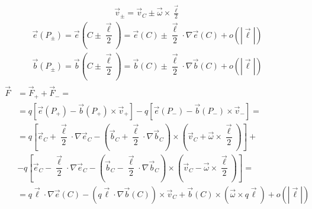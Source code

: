 \documentclass[letterpaper,10pt,english]{jupyterBook}
\begin{document}
\sphinxAtStartPar
{}
\begin{equation*}
\begin{split}\vec{v}_{\pm} = \vec{v}_C \pm \vec{\omega} \times \frac{\vec{\ell}}{2}\end{split}
\end{equation*}\begin{equation*}
\begin{split}\vec{e}(P_{\pm}) = \vec{e}\left( C \pm \dfrac{\vec{\ell}}{2} \right) = \vec{e}(C) \pm \dfrac{\vec{\ell}}{2} \cdot \nabla \vec{e}(C) + o(|\vec{\ell}|)\end{split}
\end{equation*}\begin{equation*}
\begin{split}\vec{b}(P_{\pm}) = \vec{b}\left( C \pm \dfrac{\vec{\ell}}{2} \right) = \vec{b}(C) \pm \dfrac{\vec{\ell}}{2} \cdot \nabla \vec{b}(C) + o(|\vec{\ell}|)\end{split}
\end{equation*}
\sphinxAtStartPar
{}
\begin{equation*}
\begin{split}\begin{aligned}
  \vec{F} & = \vec{F}_+ + \vec{F}_- = \\
   & = q \left[ \vec{e}(P_+) - \vec{b}(P_+) \times \vec{v}_{+} \right] - q \left[ \vec{e}(P_-) - \vec{b}(P_-) \times \vec{v}_{-} \right] = \\
   & = q \left[ \vec{e}_C + \dfrac{\vec{\ell}}{2} \cdot \nabla \vec{e}_C - \left( \vec{b}_C + \dfrac{\vec{\ell}}{2} \cdot \nabla \vec{b}_C \right) \times \left( \vec{v}_C + \vec{\omega} \times \dfrac{\vec{\ell}}{2} \right) \right] + \\ 
   & - q \left[ \vec{e}_C - \dfrac{\vec{\ell}}{2} \cdot \nabla \vec{e}_C - \left( \vec{b}_C - \dfrac{\vec{\ell}}{2} \cdot \nabla \vec{b}_C \right) \times \left( \vec{v}_C - \vec{\omega} \times \dfrac{\vec{\ell}}{2} \right) \right] = \\
   & = q \vec{\ell} \cdot \nabla \vec{e}(C) - \left( q \vec{\ell} \cdot \nabla \vec{b}(C) \right) \times \vec{v}_C + \vec{b}(C) \times \left(  \vec{\omega} \times q \vec{\ell} \right) + o(|\vec{\ell}|)
\end{aligned}\end{split}
\end{equation*}
\sphinxAtStartPar
{}
\end{document}
